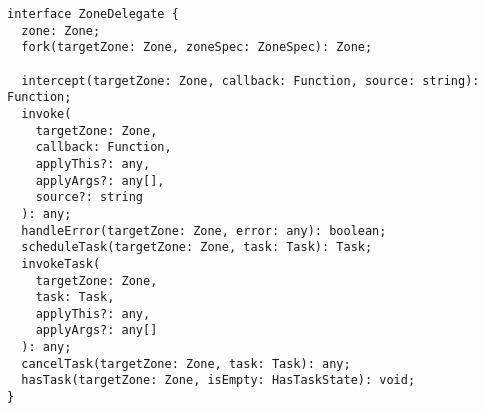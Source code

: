 \begin{verbatim}
interface ZoneDelegate {
  zone: Zone;
  fork(targetZone: Zone, zoneSpec: ZoneSpec): Zone;

  intercept(targetZone: Zone, callback: Function, source: string): Function;
  invoke(
    targetZone: Zone,
    callback: Function,
    applyThis?: any,
    applyArgs?: any[],
    source?: string
  ): any;
  handleError(targetZone: Zone, error: any): boolean;
  scheduleTask(targetZone: Zone, task: Task): Task;
  invokeTask(
    targetZone: Zone,
    task: Task,
    applyThis?: any,
    applyArgs?: any[]
  ): any;
  cancelTask(targetZone: Zone, task: Task): any;
  hasTask(targetZone: Zone, isEmpty: HasTaskState): void;
}
\end{verbatim}
